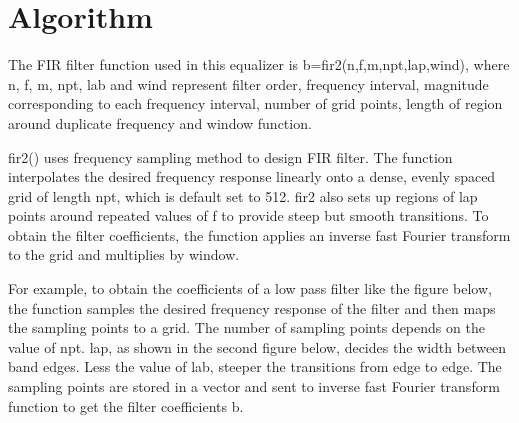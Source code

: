\documentclass[titlepage]{article}
\begin{document}
\section{Algorithm}
\label{sec:org5bcea8c}
The FIR filter function used in this equalizer is b=fir2(n,f,m,npt,lap,wind),
where n, f, m, npt, lab and wind represent filter order, frequency interval,
magnitude corresponding to each frequency interval, number of grid points,
length of region around duplicate frequency and window function. 

fir2() uses frequency sampling method to design FIR filter. The function
interpolates the desired frequency response linearly onto a dense, evenly
spaced grid of length npt, which is default set to 512. fir2 also sets up
regions of lap points around repeated values of f to provide steep but smooth
transitions. To obtain the filter coefficients, the function applies an
inverse fast Fourier transform to the grid and multiplies by window.

For example, to obtain the coefficients of a low pass filter like the figure
below, the function samples the desired frequency response of the filter and
then maps the sampling points to a grid. The number of sampling points depends
on the value of npt. lap, as shown in the second figure below, decides the
width between band edges. Less the value of lab, steeper the transitions from
edge to edge. The sampling points are stored in a vector and sent to inverse
fast Fourier transform function to get the filter coefficients b.
\end{document}
